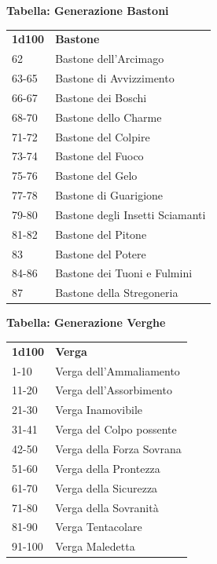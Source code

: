 \begin{multicols}{2}
	\medskip

	\textbf{Tabella: Generazione Bastoni}

	\medskip

	\begin{tabularx}{0.45\textwidth}{lX}
		\textbf{1d100} & \textbf{Bastone}\\
		62 &Bastone dell'Arcimago\\
		63-65& Bastone di Avvizzimento\\
		66-67& Bastone dei Boschi\\
		68-70& Bastone dello Charme\\
		71-72& Bastone del Colpire\\
		73-74& Bastone del Fuoco\\
		75-76& Bastone del Gelo\\
		77-78& Bastone di Guarigione\\
		79-80& Bastone degli Insetti Sciamanti\\
		81-82& Bastone del Pitone\\
		83 &Bastone del Potere\\
		84-86& Bastone dei Tuoni e Fulmini\\
		87 &Bastone della Stregoneria\\

	\end{tabularx}

	\medskip

	\textbf{Tabella: Generazione Verghe}

	\medskip

	\begin{tabularx}{0.45\textwidth}{lX}
		\textbf{1d100} & \textbf{Verga}\\
		1-10&Verga dell'Ammaliamento\\
		11-20&Verga dell'Assorbimento\\
		21-30&Verga Inamovibile\\
		31-41&Verga del Colpo possente\\
		42-50&Verga della Forza Sovrana\\
		51-60&Verga della Prontezza\\
		61-70&Verga della Sicurezza\\
		71-80&Verga della Sovranità\\
		81-90& Verga Tentacolare\\
		91-100& Verga Maledetta\\
	\end{tabularx}


\end{multicols}
